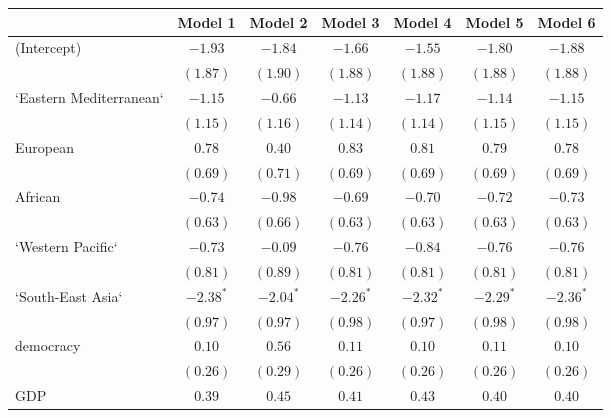 
\begin{table}[!h]
\begin{center}
\begin{tabular}{l c c c c c c }
\toprule
 & Model 1 & Model 2 & Model 3 & Model 4 & Model 5 & Model 6 \\
\midrule
(Intercept)             & $-1.93$      & $-1.84$      & $-1.66$      & $-1.55$      & $-1.80$      & $-1.88$      \\
                        & $(1.87)$     & $(1.90)$     & $(1.88)$     & $(1.88)$     & $(1.88)$     & $(1.88)$     \\
`Eastern Mediterranean` & $-1.15$      & $-0.66$      & $-1.13$      & $-1.17$      & $-1.14$      & $-1.15$      \\
                        & $(1.15)$     & $(1.16)$     & $(1.14)$     & $(1.14)$     & $(1.15)$     & $(1.15)$     \\
European                & $0.78$       & $0.40$       & $0.83$       & $0.81$       & $0.79$       & $0.78$       \\
                        & $(0.69)$     & $(0.71)$     & $(0.69)$     & $(0.69)$     & $(0.69)$     & $(0.69)$     \\
African                 & $-0.74$      & $-0.98$      & $-0.69$      & $-0.70$      & $-0.72$      & $-0.73$      \\
                        & $(0.63)$     & $(0.66)$     & $(0.63)$     & $(0.63)$     & $(0.63)$     & $(0.63)$     \\
`Western Pacific`       & $-0.73$      & $-0.09$      & $-0.76$      & $-0.84$      & $-0.76$      & $-0.76$      \\
                        & $(0.81)$     & $(0.89)$     & $(0.81)$     & $(0.81)$     & $(0.81)$     & $(0.81)$     \\
`South-East Asia`       & $-2.38^{*}$  & $-2.04^{*}$  & $-2.26^{*}$  & $-2.32^{*}$  & $-2.29^{*}$  & $-2.36^{*}$  \\
                        & $(0.97)$     & $(0.97)$     & $(0.98)$     & $(0.97)$     & $(0.98)$     & $(0.98)$     \\
democracy               & $0.10$       & $0.56$       & $0.11$       & $0.10$       & $0.11$       & $0.10$       \\
                        & $(0.26)$     & $(0.29)$     & $(0.26)$     & $(0.26)$     & $(0.26)$     & $(0.26)$     \\
GDP                     & $0.39$       & $0.45$       & $0.41$       & $0.43$       & $0.40$       & $0.40$       \\

\end{tabular}
\end{center}
\end{table}
